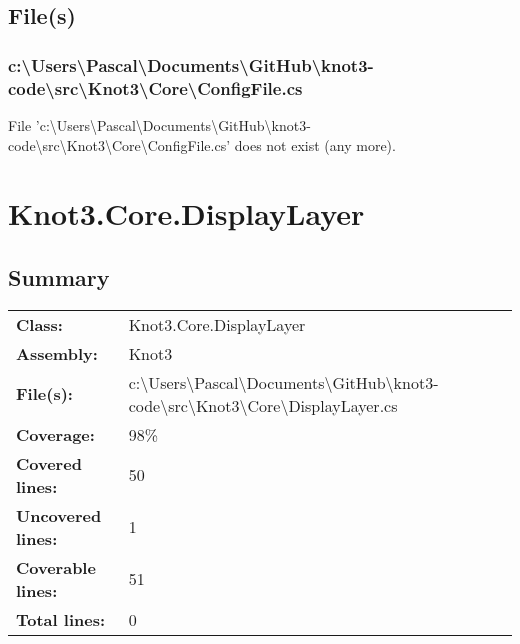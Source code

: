 \documentclass[a4paper,10pt]{article}
\begin{document}
\subsection{File(s)}
\subsubsection{c:\textbackslash Users\textbackslash Pascal\textbackslash Documents\textbackslash GitHub\textbackslash knot3-code\textbackslash src\textbackslash Knot3\textbackslash Core\textbackslash ConfigFile.cs}
 File 'c:\textbackslash Users\textbackslash Pascal\textbackslash Documents\textbackslash GitHub\textbackslash knot3-code\textbackslash src\textbackslash Knot3\textbackslash Core\textbackslash ConfigFile.cs' does not exist (any more).
\newpage
\section{Knot3.Core.DisplayLayer}
\subsection{Summary}
\begin{longtable}[l]{ll}
\textbf{Class:} & Knot3.Core.DisplayLayer\\
\textbf{Assembly:} & Knot3\\
\textbf{File(s):} & \begin{minipage}[t]{12cm}{c:\textbackslash Users\textbackslash Pascal\textbackslash Documents\textbackslash GitHub\textbackslash knot3-code\textbackslash src\textbackslash Knot3\textbackslash Core\textbackslash DisplayLayer.cs}\end{minipage} \\
\textbf{Coverage:} & 98\%\\
\textbf{Covered lines:} & 50\\
\textbf{Uncovered lines:} & 1\\
\textbf{Coverable lines:} & 51\\
\textbf{Total lines:} & 0\\
\end{longtable}
\end{document}
